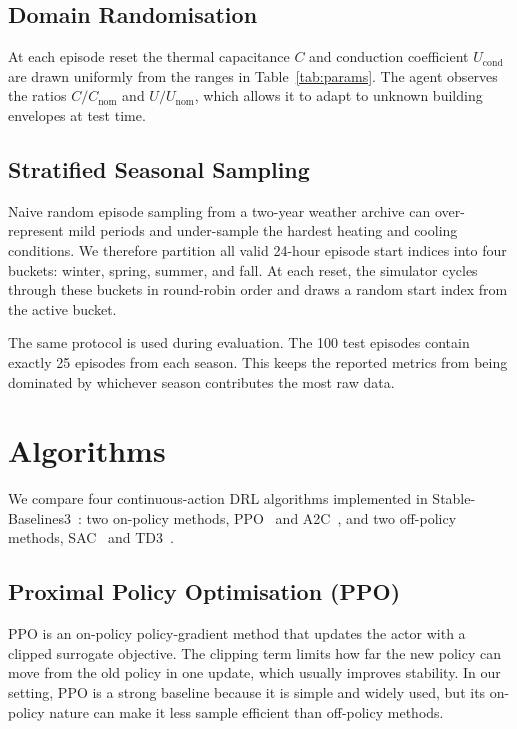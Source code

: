 \documentclass[conference]{IEEEtran}
\begin{document}
\subsection{Domain Randomisation}
\label{subsec:domain-rand}
At each episode reset the thermal capacitance $C$ and conduction
coefficient $U_{\text{cond}}$ are drawn uniformly from the ranges in
Table~\ref{tab:params}. The agent observes the ratios
$C/C_{\text{nom}}$ and $U/U_{\text{nom}}$, which allows it to adapt
to unknown building envelopes at test time.

\subsection{Stratified Seasonal Sampling}
\label{subsec:seasonal-sampling}
Naive random episode sampling from a two-year weather archive can
over-represent mild periods and under-sample the hardest heating and
cooling conditions. We therefore partition all valid 24-hour episode start
indices into four buckets: winter, spring, summer, and fall. At each reset,
the simulator cycles through these buckets in round-robin order and draws
a random start index from the active bucket.

The same protocol is used during evaluation. The 100 test episodes contain
exactly 25 episodes from each season. This keeps the reported metrics from
being dominated by whichever season contributes the most raw data.

\section{Algorithms}
\label{sec:algorithms}
We compare four continuous-action DRL algorithms implemented in
Stable-Baselines3~\cite{raffin2021sb3}: two on-policy methods,
PPO~\cite{schulman2017ppo} and A2C~\cite{mnih2016a2c}, and two
off-policy methods, SAC~\cite{haarnoja2018sac} and
TD3~\cite{fujimoto2018td3}.

\subsection{Proximal Policy Optimisation (PPO)}
\label{subsec:ppo}
PPO is an on-policy policy-gradient method that updates the actor with a
clipped surrogate objective. The clipping term limits how far the new
policy can move from the old policy in one update, which usually improves
stability. In our setting, PPO is a strong baseline because it is simple and
widely used, but its on-policy nature can make it less sample efficient than
off-policy methods.
\end{document}
